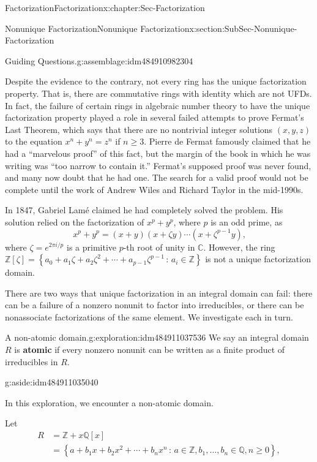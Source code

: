 \documentclass[oneside,10pt,]{book}
\newcommand{\terminology}[1]{\textbf{#1}}
\numberwithin{equation}{section}
\renewcommand{\ge}{\geqslant}
\newcommand{\setof}[2]{{\left\{#1\,\colon\,#2\right\}}}
\def\C{{\mathbb C}}
\def\Z{{\mathbb Z}}
\def\Q{{\mathbb Q}}
\newcommand{\amp}{&}
\begin{document}
\begin{chapterptx}{Factorization}{}{Factorization}{}{}{x:chapter:Sec-Factorization}
\begin{sectionptx}{Nonunique Factorization}{}{Nonunique Factorization}{}{}{x:section:SubSec-Nonunique-Factorization}
\begin{assemblage}{Guiding Questions.}{g:assemblage:idm484910982304}
\begin{itemize}[label=\textbullet]
\end{itemize}
%
\end{assemblage}
Despite the evidence to the contrary, not every ring has the unique factorization property. That is, there are commutative rings with identity which are not UFDs.  In fact, the failure of certain rings in algebraic number theory to have the unique factorization property played a role in several failed attempts to prove Fermat's Last Theorem, which says that there are no nontrivial integer solutions \((x,y,z)\) to the equation \(x^n + y^n = z^n\) if \(n \ge 3\). Pierre de Fermat famously claimed that he had a ``marvelous proof'' of this fact, but the margin of the book in which he was writing was ``too narrow to contain it.'' Fermat's supposed proof was never found, and many now doubt that he had one. The search for a valid proof would not be complete until the work of Andrew Wiles and Richard Taylor in the mid-1990s.%
\par
In 1847, Gabriel Lamé claimed he had completely solved the problem. His solution relied on the factorization of \(x^p + y^p\), where \(p\) is an odd prime, as%
\begin{equation*}
x^p + y^p = (x+y)(x+\zeta y) \cdots (x+\zeta^{p-1}y)\text{,}
\end{equation*}
where \(\zeta = e^{2\pi i/p}\) is a primitive \(p\)-th root of unity in \(\C\). However, the ring \(\Z[\zeta] = \setof{a_0 + a_1 \zeta + a_2 \zeta^2 + \cdots + a_{p-1} \zeta^{p-1}}{a_i\in\Z}\) is not a unique factorization domain.%
\par
There are two ways that unique factorization in an integral domain can fail: there can be a failure of a nonzero nonunit to factor into irreducibles, or there can be nonassociate factorizations of the same element. We investigate each in turn.%
\begin{exploration}{A non-atomic domain.}{g:exploration:idm484911037536}%
We say an integral domain \(R\) is \terminology{atomic} if every nonzero nonunit can be written as a finite product of irreducibles in \(R\). \begin{aside}{}{g:aside:idm484911035040}%
\end{aside}
 In this exploration, we encounter a non-atomic domain.%
\par
Let%
\begin{align*}
R \amp = \Z + x\Q[x]\\
\amp = \setof{a + b_1 x + b_2 x^2 + \cdots + b_n x^n}{a\in \Z, b_1,\ldots, b_n \in \Q, n\ge 0},
\end{align*}

\end{exploration}
\end{sectionptx}
\end{chapterptx}
\end{document}
